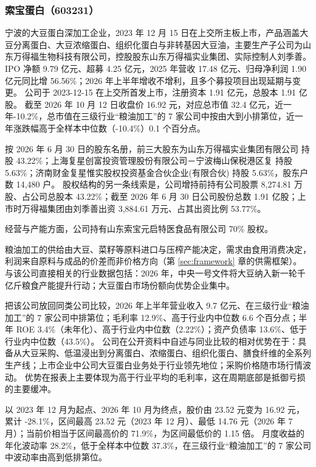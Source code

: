 \subsubsection{索宝蛋白（603231）}
\label{co:603231}

 宁波的大豆蛋白深加工企业，2023 年 12 月 15 日在上交所主板上市，产品涵盖大豆分离蛋白、大豆浓缩蛋白、组织化蛋白与非转基因大豆油，主要生产子公司为山东万得福生物科技有限公司，控股股东山东万得福实业集团、实际控制人刘季善。IPO 净额 9.79 亿元、超募 4.25 亿元，2025 年营收 17.48 亿元、归母净利润 1.90 亿元同比增 56.56\%；2026 年上半年增收不增利，且多个募投项目出现延期与变更。 公司于 2023-12-15 在上交所首发上市，注册资本 1.91 亿元，总股本 1.91 亿股。 截至 2026 年 10 月 12 日收盘价 16.92 元，对应总市值 32.4 亿元，近一年-10.2\%，总市值在三级行业“粮油加工”的 7 家公司中按由大到小排第位，近一年涨跌幅高于全样本中位数（-10.4\%）0.1 个百分点。

 按 2026 年 6 月 30 日的股东名册，前三大股东为山东万得福实业集团有限公司 持股 43.22\%；上海复星创富投资管理股份有限公司－宁波梅山保税港区复 持股 5.63\%；济南财金复星惟实股权投资基金合伙企业(有限合伙) 持股 5.63\%，股东户数 14,480 户。 股权结构的另一条线索是，公司增持前持有公司股票 8,274.81 万股、占公司总股本 43.22\%；截至 2026 年 6 月 30 日公司股份总数 1.91 亿股；上市时万得福集团由刘季善出资 3,884.61 万元、占其出资比例 53.77\%。

 经营与产能方面，公司持有山东索宝元启特医食品有限公司 70\% 股权。

 粮油加工的供给由大豆、菜籽等原料进口与压榨产能决定，需求由食用消费决定，利润来自原料与成品的价差而非价格方向（第 \ref{sec:framework} 章的供需框架）。 与该公司直接相关的行业数据包括：2026 年，中央一号文件将大豆纳入新一轮千亿斤粮食产能提升行动；大豆蛋白市场份额向优势企业集中。

 把该公司放回同类公司比较，2026 年上半年营业收入 9.7 亿元、在三级行业“粮油加工”的 7 家公司中排第位；毛利率 12.9\%、高于行业内中位数 6.6 个百分点；半年 ROE 3.4\%（未年化）、高于行业内中位数（2.22\%）；资产负债率 13.6\%、低于行业内中位数（43.5\%）。 公司在公开资料中自述与同业比较的相对优势在于：具备从大豆采购、低温浸出到分离蛋白、浓缩蛋白、组织化蛋白、膳食纤维的全系列生产线；上市企业中公司大豆蛋白业务处于行业领先地位；采购价格随市场行情波动。 优势在报表上主要体现为高于行业平均的毛利率，这在周期底部是抵御亏损的主要缓冲。

 以 2023 年 12 月为起点、2026 年 10 月为终点，股价由 23.52 元变为 16.92 元，累计 -28.1\%，区间最高 23.52 元（2023 年 12 月）、最低 14.76 元（2026 年 7 月）；当前价相当于区间最高价的 71.9\%，为区间最低价的 1.15 倍。 月度收益的年化波动率 28.2\%，低于全样本中位数 37.3\%，在三级行业“粮油加工”的 7 家公司中波动率由高到低排第位。


